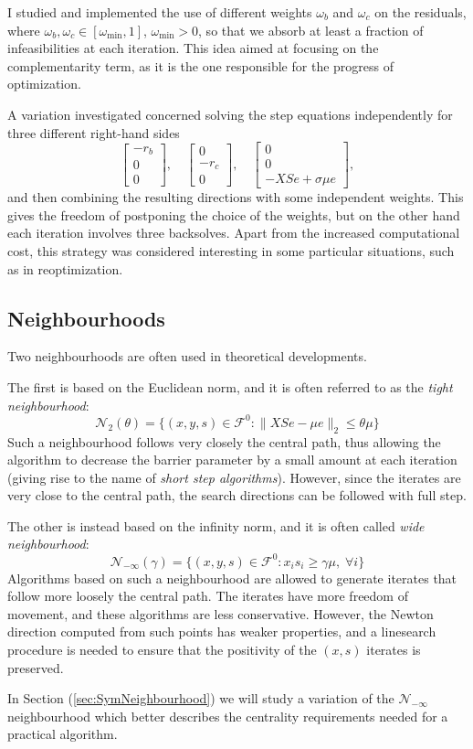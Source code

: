 I studied and implemented the use of different weights $\omega_b$ 
and $\omega_c$ on the residuals, where 
$\omega_b, \omega_c \in [ \omega_{\min}, 1]$, $\omega_{\min}>0$, 
so that we absorb at least a fraction of infeasibilities at each 
iteration. This idea aimed at focusing on the complementarity term, 
as it is the one responsible for the progress of optimization.

A variation investigated concerned solving the step equations 
independently for three different right-hand sides
\[
\left[ \begin{array}{c}
    -r_b \\ 0 \\ 0 
  \end{array} \right], \quad
\left[ \begin{array}{c}
    0 \\ -r_c \\ 0 
  \end{array} \right], \quad
\left[ \begin{array}{c}
    0 \\ 0  \\ -XSe + \sigma\mu e
  \end{array} \right],
\]
and then combining the resulting directions with some independent 
weights. This gives the freedom of postponing the choice of the 
weights, but on the other hand each iteration involves three 
backsolves. Apart from the increased computational cost, this 
strategy was considered interesting in some particular situations, 
such as in reoptimization.

%
%
\subsection{Neighbourhoods}

Two neighbourhoods are often used in theoretical developments.

The first is based on the Euclidean norm, and it is often referred
to as the {\em tight neighbourhood}:
\[
\mathcal{N}_2(\theta) = \{ (x,y,s) \in \mathcal{F}^0 :
                         \| XSe - \mu e \|_2 \le \theta\mu \}
\]
Such a neighbourhood follows very closely the central path, thus
allowing the algorithm to decrease the barrier parameter
by a small amount at each iteration (giving rise to the name
of {\em short step algorithms}). However,
since the iterates are very close to the central path, the 
search directions can be followed with full step.

The other is instead based on the infinity norm, and it is often
called {\em wide neighbourhood}:
\[
\mathcal{N}_{-\infty}(\gamma) = \{ (x,y,s) \in \mathcal{F}^0 :
                         x_is_i \ge \gamma\mu, \; \forall i \}
\]
Algorithms based on such a neighbourhood are allowed to generate
iterates that follow more loosely the central path. The iterates 
have more freedom of movement, and these algorithms are less 
conservative. However, the Newton direction computed from such 
points has weaker properties, and a linesearch procedure is
needed to ensure that the positivity of the $(x,s)$ iterates is
preserved.

In Section (\ref{sec:SymNeighbourhood}) we will study a variation
of the $\mathcal{N}_{-\infty}$ neighbourhood which better describes
the centrality requirements needed for a practical algorithm.

